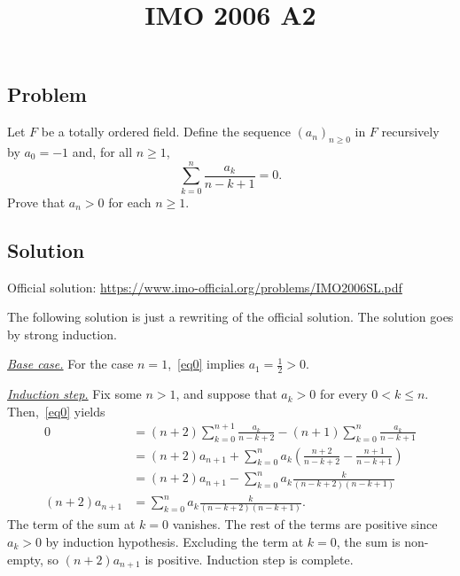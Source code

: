 \documentclass{article}
\title{IMO 2006 A2}
\author{}
\date{}
\begin{document}
\maketitle



\subsection*{Problem}

Let $F$ be a totally ordered field.
Define the sequence $(a_n)_{n \geq 0}$ in $F$ recursively by $a_0 = -1$ and, for all $n \geq 1$,
\[ \sum_{k = 0}^n \frac{a_k}{n - k + 1} = 0. \tag{*}\label{2006a2-eq0} \]
Prove that $a_n > 0$ for each $n \geq 1$.



\subsection*{Solution}

Official solution: \url{https://www.imo-official.org/problems/IMO2006SL.pdf}

The following solution is just a rewriting of the official solution.
The solution goes by strong induction.

\textit{\underline{Base case.}}
For the case $n = 1$,~\eqref{eq0} implies $a_1 = \frac{1}{2} > 0$.

\textit{\underline{Induction step.}}
Fix some $n > 1$, and suppose that $a_k > 0$ for every $0 < k \leq n$.
Then,~\eqref{eq0} yields
\begin{align*}
    0
    &= (n + 2) \sum_{k = 0}^{n + 1} \frac{a_k}{n - k + 2} - (n + 1) \sum_{k = 0}^n \frac{a_k}{n - k + 1} \\
    &= (n + 2) a_{n + 1} + \sum_{k = 0}^n a_k \left(\frac{n + 2}{n - k + 2} - \frac{n + 1}{n - k + 1}\right) \\
    &= (n + 2) a_{n + 1} - \sum_{k = 0}^n a_k \frac{k}{(n - k + 2)(n - k + 1)} \\
(n + 2) a_{n + 1}
    &= \sum_{k = 0}^n a_k \frac{k}{(n - k + 2)(n - k + 1)}.
\end{align*}
The term of the sum at $k = 0$ vanishes.
The rest of the terms are positive since $a_k > 0$ by induction hypothesis.
Excluding the term at $k = 0$, the sum is non-empty, so $(n + 2) a_{n + 1}$ is positive.
Induction step is complete.
\end{document}
